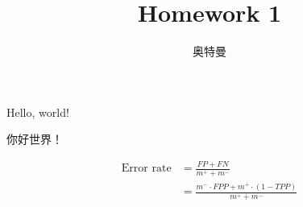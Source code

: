 \documentclass[a4paper,12pt]{article}
\title{Homework 1}
\author{奥特曼}
\date{}
\begin{document}
\maketitle

Hello, world!

你好世界！

\begin{equation}
    \begin{aligned}
        \text{Error rate} & = \frac{FP+FN}{m^+ + m^-}                           \\
                          & = \frac{m^- \cdot FPP + m^+\cdot(1-TPP)}{m^+ + m^-}
    \end{aligned}
\end{equation}
\end{document}
